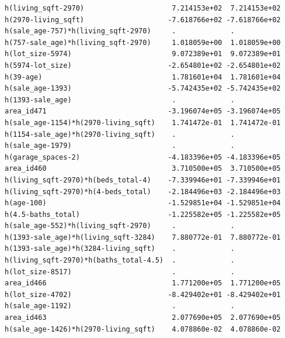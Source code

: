 \documentclass[
]{article}
\begin{document}
\begin{verbatim}
h(living_sqft-2970)                     7.214153e+02  7.214153e+02
h(2970-living_sqft)                    -7.618766e+02 -7.618766e+02
h(sale_age-757)*h(living_sqft-2970)     .             .           
h(757-sale_age)*h(living_sqft-2970)     1.018059e+00  1.018059e+00
h(lot_size-5974)                        9.072389e+01  9.072389e+01
h(5974-lot_size)                       -2.654801e+02 -2.654801e+02
h(39-age)                               1.781601e+04  1.781601e+04
h(sale_age-1393)                       -5.742435e+02 -5.742435e+02
h(1393-sale_age)                        .             .           
area_id471                             -3.196074e+05 -3.196074e+05
h(sale_age-1154)*h(2970-living_sqft)    1.741472e-01  1.741472e-01
h(1154-sale_age)*h(2970-living_sqft)    .             .           
h(sale_age-1979)                        .             .           
h(garage_spaces-2)                     -4.183396e+05 -4.183396e+05
area_id460                              3.710500e+05  3.710500e+05
h(living_sqft-2970)*h(beds_total-4)    -7.339946e+01 -7.339946e+01
h(living_sqft-2970)*h(4-beds_total)    -2.184496e+03 -2.184496e+03
h(age-100)                             -1.529851e+04 -1.529851e+04
h(4.5-baths_total)                     -1.225582e+05 -1.225582e+05
h(sale_age-552)*h(living_sqft-2970)     .             .           
h(1393-sale_age)*h(living_sqft-3284)    7.880772e-01  7.880772e-01
h(1393-sale_age)*h(3284-living_sqft)    .             .           
h(living_sqft-2970)*h(baths_total-4.5)  .             .           
h(lot_size-8517)                        .             .           
area_id466                              1.771200e+05  1.771200e+05
h(lot_size-4702)                       -8.429402e+01 -8.429402e+01
h(sale_age-1192)                        .             .           
area_id463                              2.077690e+05  2.077690e+05
h(sale_age-1426)*h(2970-living_sqft)    4.078860e-02  4.078860e-02
                                                                  

\end{verbatim}
\end{document}
